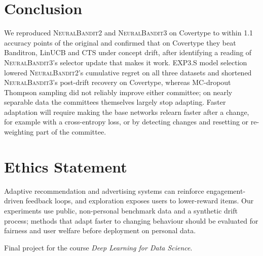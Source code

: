 \documentclass[sigconf]{acmart}
\newcommand{\NB}{\textsc{NeuralBandit}}
\begin{document}
\section{Conclusion}
We reproduced \NB{}2 and \NB{}3 on Covertype to within 1.1 accuracy points of the original and confirmed
that on Covertype they beat Banditron, LinUCB and CTS under concept drift, after identifying a reading of \NB{}3's selector
update that makes it work. EXP3.S model selection lowered \NB{}2's cumulative regret on all three datasets and shortened \NB{}3's
post-drift recovery on Covertype, whereas MC-dropout Thompson sampling did not reliably improve either committee; on
nearly separable data the committees themselves largely stop adapting. Faster adaptation will
require making the base networks relearn faster after a change, for example with a
cross-entropy loss, or by detecting changes and resetting or re-weighting part of the committee.

\section*{Ethics Statement}
Adaptive recommendation and advertising systems can reinforce engagement-driven feedback loops, and exploration
exposes users to lower-reward items. Our experiments use public, non-personal benchmark data and a synthetic drift
process; methods that adapt faster to changing behaviour should be evaluated for fairness and user welfare before
deployment on personal data.

\begin{acks}
Final project for the course \emph{Deep Learning for Data Science}.
\end{acks}




\appendix
\end{document}

